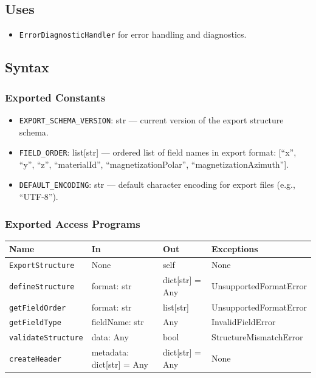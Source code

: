 \documentclass[12pt, titlepage]{article}
\begin{document}
\subsection{Uses}
\begin{itemize}
  \item \texttt{ErrorDiagnosticHandler} for error handling and diagnostics.
\end{itemize}

\subsection{Syntax}

\subsubsection{Exported Constants}
\begin{itemize}
  \item \texttt{EXPORT\_SCHEMA\_VERSION}: str — current version of the export structure schema.
  \item \texttt{FIELD\_ORDER}: list[str] — ordered list of field names in export format: [``x'', ``y'', ``z'', ``materialId'', ``magnetizationPolar'', ``magnetizationAzimuth''].
  \item \texttt{DEFAULT\_ENCODING}: str — default character encoding for export files (e.g., ``UTF-8'').
\end{itemize}

\subsubsection{Exported Access Programs}
\begin{center}
\renewcommand{\arraystretch}{1.3}
\begin{tabular}{p{4cm} p{4.5cm} p{3.5cm} p{3.5cm}}
\toprule
\textbf{Name} & \textbf{In} & \textbf{Out} & \textbf{Exceptions} \\
\midrule
\texttt{ExportStructure} & None & self & None \\ 
\texttt{defineStructure} & format: str & dict[str] = Any & UnsupportedFormatError \\
\texttt{getFieldOrder} & format: str & list[str] & UnsupportedFormatError \\
\texttt{getFieldType} & fieldName: str & Any & InvalidFieldError \\
\texttt{validateStructure} & data: Any & bool & StructureMismatchError \\
\texttt{createHeader} & metadata: dict[str] = Any & dict[str] = Any & None \\
\bottomrule
\end{tabular}
\end{center}
\end{document}
